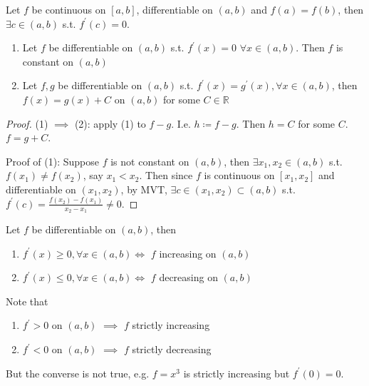 \begin{theorem}
    Let $f$ be continuous on $[a, b]$, differentiable on $(a, b)$
    and $f(a) = f(b)$, then $\exists c \in (a, b)$ s.t. 
    $f^{\prime}(c) = 0$.
\end{theorem}

\begin{corollary}
    \hfill
    \begin{enumerate}
        \item Let $f$ be differentiable on $(a,b)$ s.t. $f^{\prime}(x) = 0$
        $\forall x \in (a, b)$. Then $f$ is constant on $(a,b)$
        \item Let $f, g$ be differentiable on $(a,b)$ s.t. 
        $f^{\prime}(x) = g^{\prime}(x), \forall x \in (a, b)$, then 
        $f(x) = g(x) + C$ on $(a, b)$ for some $C \in \mathbb{R}$
    \end{enumerate} 
\end{corollary}

\begin{proof}
    (1) $\implies$ (2): apply (1) to $f - g$.
    I.e. $h \coloneq f - g$. Then $h = C$ for some $C$.
    $f = g + C$.
    \medskip 

    Proof of (1): Suppose $f$ is not constant
    on $(a,b)$, then $\exists x_1, x_2 \in (a, b)$
    s.t. $f(x_1) \neq f(x_2)$, say $x_1 < x_2$. 
    Then since $f$ is continuous on $[x_1, x_2]$ and 
    differentiable on $(x_1, x_2)$, by MVT, 
    $\exists c \in (x_1, x_2) \subset (a, b)$ s.t. 
    $f^{\prime}(c) = \frac{f(x_2) - f(x_1)}{x_2 - x_1} \neq 0$.
\end{proof}

\begin{corollary}
    \label{cor:derivatives-of-monotone-functions}
    Let $f$ be differentiable on $(a, b)$, then 
    \begin{enumerate}
        \item $f^{\prime}(x) \geq 0, \forall x \in (a, b) \iff $  $f$ increasing on $(a,b)$
        \item $f^{\prime}(x) \leq 0, \forall x \in (a, b) \iff $  $f$ decreasing on $(a,b)$
    \end{enumerate} 
\end{corollary}

\begin{remark}
    Note that
    \begin{enumerate}
        \item $f^{\prime} > 0$ on $(a, b)$ $\implies$ $f$ strictly increasing
        \item $f^{\prime} < 0$ on $(a, b)$ $\implies$ $f$ strictly decreasing
    \end{enumerate} 
    But the converse is not true,
    e.g. $f= x^{3}$ is strictly increasing but $f^{\prime}(0) = 0$.
\end{remark}

